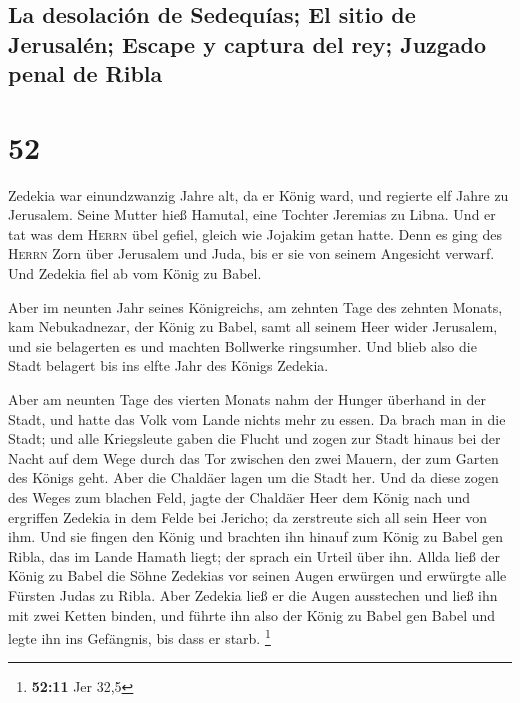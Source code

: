 \hypertarget{la-desolaciuxf3n-de-sedequuxedas-el-sitio-de-jerusaluxe9n-escape-y-captura-del-rey-juzgado-penal-de-ribla}{%
\subsection{La desolación de Sedequías; El sitio de Jerusalén; Escape y
captura del rey; Juzgado penal de
Ribla}\label{la-desolaciuxf3n-de-sedequuxedas-el-sitio-de-jerusaluxe9n-escape-y-captura-del-rey-juzgado-penal-de-ribla}}

\hypertarget{section-51}{%
\section{52}\label{section-51}}

 Zedekia war einundzwanzig Jahre alt, da er König ward,
und regierte elf Jahre zu Jerusalem. Seine Mutter hieß Hamutal, eine
Tochter Jeremias zu Libna.  Und er tat was dem
\textsc{Herrn} übel gefiel, gleich wie Jojakim getan hatte.
 Denn es ging des \textsc{Herrn} Zorn über Jerusalem und
Juda, bis er sie von seinem Angesicht verwarf. Und Zedekia fiel ab vom
König zu Babel.

 Aber im neunten Jahr seines Königreichs, am zehnten Tage
des zehnten Monats, kam Nebukadnezar, der König zu Babel, samt all
seinem Heer wider Jerusalem, und sie belagerten es und machten Bollwerke
ringsumher.  Und blieb also die Stadt belagert bis ins
elfte Jahr des Königs Zedekia.

 Aber am neunten Tage des vierten Monats nahm der Hunger
überhand in der Stadt, und hatte das Volk vom Lande nichts mehr zu
essen.  Da brach man in die Stadt; und alle Kriegsleute
gaben die Flucht und zogen zur Stadt hinaus bei der Nacht auf dem Wege
durch das Tor zwischen den zwei Mauern, der zum Garten des Königs geht.
Aber die Chaldäer lagen um die Stadt her.  Und da diese
zogen des Weges zum blachen Feld, jagte der Chaldäer Heer dem König nach
und ergriffen Zedekia in dem Felde bei Jericho; da zerstreute sich all
sein Heer von ihm.  Und sie fingen den König und brachten
ihn hinauf zum König zu Babel gen Ribla, das im Lande Hamath liegt; der
sprach ein Urteil über ihn.  Allda ließ der König zu
Babel die Söhne Zedekias vor seinen Augen erwürgen und erwürgte alle
Fürsten Judas zu Ribla.  Aber Zedekia ließ er die Augen
ausstechen und ließ ihn mit zwei Ketten binden, und führte ihn also der
König zu Babel gen Babel und legte ihn ins Gefängnis, bis dass er starb.
\footnote{\textbf{52:11} Jer 32,5}

